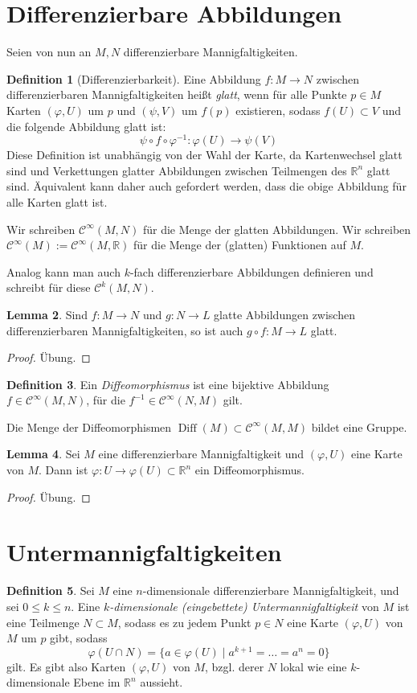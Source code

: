 \documentclass[a4paper]{scrbook}
\numberwithin{equation}{chapter}
\DeclareMathOperator{\Diff}{Diff}
\newcommand{\R}{\mathbb{R}}
\newcommand{\sC}{\mathcal{C}^{\infty}}
\theoremstyle{definition}
\newtheorem{defn}{Definition}[section]
\newtheorem{lemma}[defn]{Lemma}
\newcommand{\bewUeb}{\begin{proof}Übung.\end{proof}}
\begin{document}
	\section{Differenzierbare Abbildungen}
		Seien von nun an $M,N$ differenzierbare Mannigfaltigkeiten.
		\begin{defn}[Differenzierbarkeit]
			Eine Abbildung $f\colon M\rightarrow N$ zwischen differenzierbaren Mannigfaltigkeiten heißt \emph{glatt}, wenn für alle Punkte $p\in M$ Karten $(\varphi,U)$ um  $p$ und $(\psi,V)$ um $f(p)$ existieren, sodass $f(U)\subset V$ und die folgende Abbildung glatt ist:
			\begin{equation}
				\psi\circ f \circ \varphi^{-1}\colon \varphi(U)\rightarrow \psi(V)
			\end{equation}
			Diese Definition ist unabhängig von der Wahl der Karte, da Kartenwechsel glatt sind und Verkettungen glatter Abbildungen zwischen Teilmengen des $\R^n$ glatt sind. Äquivalent kann daher auch gefordert werden, dass die obige Abbildung für alle Karten glatt ist.

			Wir schreiben $\sC(M,N)$ für die Menge der glatten Abbildungen. Wir schreiben $\sC(M) := \sC(M,\R)$ für die Menge der (glatten) Funktionen auf $M$.
			
			Analog kann man auch $k$-fach differenzierbare Abbildungen definieren und schreibt für diese $\mathcal{C}^k(M,N)$.
		\end{defn}
		\begin{lemma}
			Sind $f\colon M\to N$ und $g\colon N \to L$ glatte Abbildungen zwischen differenzierbaren Mannigfaltigkeiten, so ist auch $g\circ f \colon M \to L$ glatt.
			\bewUeb
		\end{lemma}
		\begin{defn}
			Ein \emph{Diffeomorphismus} ist eine bijektive Abbildung $f\in\sC(M,N)$, für die $f^{-1}\in\sC(N,M)$ gilt.

			Die Menge der Diffeomorphismen $\Diff(M)\subset\sC(M,M)$ bildet eine Gruppe.
		\end{defn}
		\begin{lemma} \label{lemma:karte_diffeo}
			Sei $M$ eine differenzierbare Mannigfaltigkeit und $(\varphi,U)$ eine Karte von $M$. Dann ist $\varphi\colon U \to \varphi(U) \subset \R^n$ ein Diffeomorphismus.
			\bewUeb
		\end{lemma}

\section{Untermannigfaltigkeiten}
\begin{defn}
	Sei $M$ eine $n$-dimensionale differenzierbare Mannigfaltigkeit, und sei $0 \le k \le n$. Eine \emph{$k$-dimensionale (eingebettete) Untermannigfaltigkeit} von $M$ ist eine Teilmenge $N \subset M$, sodass es zu jedem Punkt $p \in N$ eine Karte $(\varphi,U)$ von $M$ um $p$ gibt, sodass
	\[\varphi(U\cap N) = \{a \in \varphi(U) \mid a^{k+1} = \dots = a^n = 0\}\]
	gilt. Es gibt also Karten $(\varphi,U)$ von $M$, bzgl. derer $N$ lokal wie eine $k$-dimensionale Ebene im $\R^n$ aussieht.
\end{defn}
\end{document}
